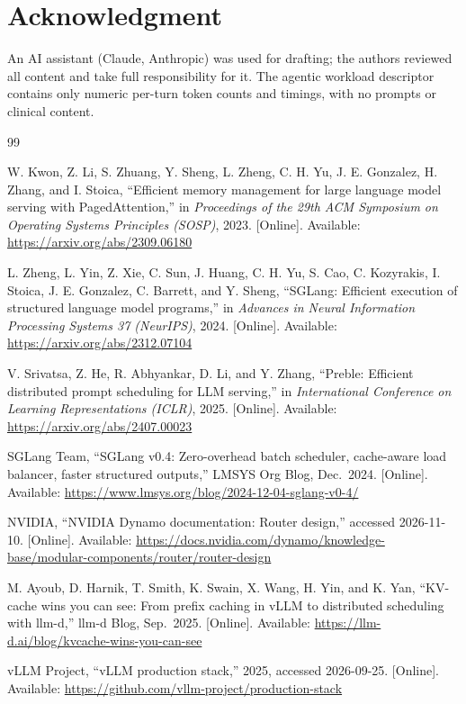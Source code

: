 \documentclass[conference]{IEEEtran}
\begin{document}
\section*{Acknowledgment}
An AI assistant (Claude, Anthropic) was used for drafting; the authors reviewed all content and take full responsibility for it. The agentic workload descriptor contains only numeric per-turn token counts and timings, with no prompts or clinical content.

\begin{thebibliography}{99}

 W. Kwon, Z. Li, S. Zhuang, Y. Sheng, L. Zheng, C. H. Yu, J. E. Gonzalez, H. Zhang, and I. Stoica, ``Efficient memory management for large language model serving with PagedAttention,'' in \emph{Proceedings of the 29th ACM Symposium on Operating Systems Principles (SOSP)}, 2023. [Online]. Available: \url{https://arxiv.org/abs/2309.06180}

 L. Zheng, L. Yin, Z. Xie, C. Sun, J. Huang, C. H. Yu, S. Cao, C. Kozyrakis, I. Stoica, J. E. Gonzalez, C. Barrett, and Y. Sheng, ``SGLang: Efficient execution of structured language model programs,'' in \emph{Advances in Neural Information Processing Systems 37 (NeurIPS)}, 2024. [Online]. Available: \url{https://arxiv.org/abs/2312.07104}

 V. Srivatsa, Z. He, R. Abhyankar, D. Li, and Y. Zhang, ``Preble: Efficient distributed prompt scheduling for LLM serving,'' in \emph{International Conference on Learning Representations (ICLR)}, 2025. [Online]. Available: \url{https://arxiv.org/abs/2407.00023}

 SGLang Team, ``SGLang v0.4: Zero-overhead batch scheduler, cache-aware load balancer, faster structured outputs,'' LMSYS Org Blog, Dec.\ 2024. [Online]. Available: \url{https://www.lmsys.org/blog/2024-12-04-sglang-v0-4/}

 NVIDIA, ``NVIDIA Dynamo documentation: Router design,'' accessed 2026-11-10. [Online]. Available: \url{https://docs.nvidia.com/dynamo/knowledge-base/modular-components/router/router-design}

 M. Ayoub, D. Harnik, T. Smith, K. Swain, X. Wang, H. Yin, and K. Yan, ``KV-cache wins you can see: From prefix caching in vLLM to distributed scheduling with llm-d,'' llm-d Blog, Sep.\ 2025. [Online]. Available: \url{https://llm-d.ai/blog/kvcache-wins-you-can-see}

 vLLM Project, ``vLLM production stack,'' 2025, accessed 2026-09-25. [Online]. Available: \url{https://github.com/vllm-project/production-stack}


\end{thebibliography}
\end{document}
